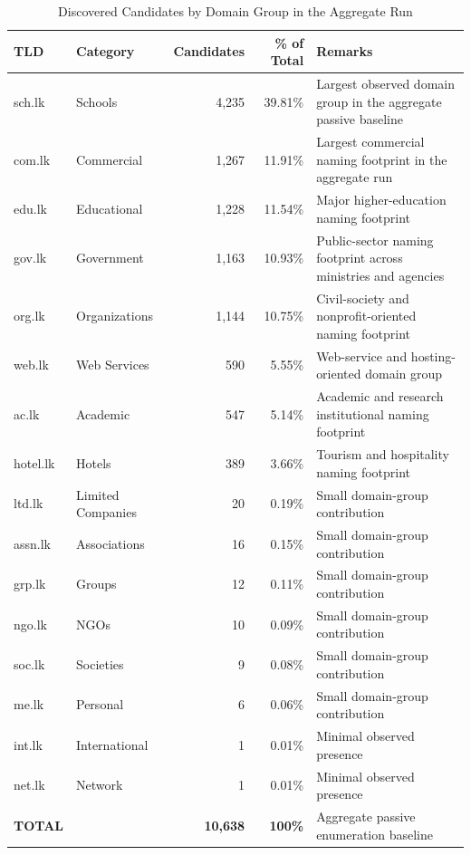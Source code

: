 \documentclass[preprint,review,12pt]{elsarticle}
\begin{document}
\begin{table}[htbp]
\centering
\caption{Discovered Candidates by Domain Group in the Aggregate Run}
\label{tab:distribution}
\begin{tabular}{|l|l|r|r|p{5cm}|}
\hline
TLD & Category & Candidates & \% of Total & Remarks \\
\hline
sch.lk & Schools & 4,235 & 39.81\% & Largest observed domain group in the aggregate passive baseline \\
\hline
com.lk & Commercial & 1,267 & 11.91\% & Largest commercial naming footprint in the aggregate run \\
\hline
edu.lk & Educational & 1,228 & 11.54\% & Major higher-education naming footprint \\
\hline
gov.lk & Government & 1,163 & 10.93\% & Public-sector naming footprint across ministries and agencies \\
\hline
org.lk & Organizations & 1,144 & 10.75\% & Civil-society and nonprofit-oriented naming footprint \\
\hline
web.lk & Web Services & 590 & 5.55\% & Web-service and hosting-oriented domain group \\
\hline
ac.lk & Academic & 547 & 5.14\% & Academic and research institutional naming footprint \\
\hline
hotel.lk & Hotels & 389 & 3.66\% & Tourism and hospitality naming footprint \\
\hline
ltd.lk & Limited Companies & 20 & 0.19\% & Small domain-group contribution \\
\hline
assn.lk & Associations & 16 & 0.15\% & Small domain-group contribution \\
\hline
grp.lk & Groups & 12 & 0.11\% & Small domain-group contribution \\
\hline
ngo.lk & NGOs & 10 & 0.09\% & Small domain-group contribution \\
\hline
soc.lk & Societies & 9 & 0.08\% & Small domain-group contribution \\
\hline
me.lk & Personal & 6 & 0.06\% & Small domain-group contribution \\
\hline
int.lk & International & 1 & 0.01\% & Minimal observed presence \\
\hline
net.lk & Network & 1 & 0.01\% & Minimal observed presence \\
\hline
\textbf{TOTAL} & & \textbf{10,638} & \textbf{100\%} & Aggregate passive enumeration baseline \\
\hline
\end{tabular}
\end{table}
\end{document}
